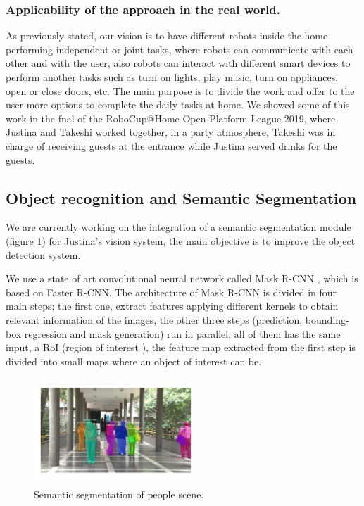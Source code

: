 \documentclass{llncs}
\begin{document}
\subsubsection{Applicability of the approach in the real world.} 

As previously stated, 
our vision is to have different robots inside the home performing independent or joint tasks, 
where robots can communicate with each other and with the user, 
 also robots can interact with different smart devices to perform another tasks such as turn on lights, play music, turn on appliances, open or close doors, etc.
The main purpose is to divide the work and offer to the user more options to complete the daily tasks at home.
We showed some of this work in the fnal of the RoboCup@Home Open Platform League 2019, where Justina and Takeshi worked together, in a party atmosphere, Takeshi was in charge of receiving guests at the entrance while Justina served drinks for the guests.


\subsection{Object recognition and Semantic Segmentation}\label{subsec:obj_recognition}

We are currently working on the integration of a semantic segmentation module (figure \ref{fig:semanticsegmetation}) for Justina's vision system, the main objective is to improve the object detection system.

We use a state of art convolutional neural network called Mask R-CNN \cite{mask-rcnn}, which is based on Faster R-CNN. The architecture of Mask R-CNN  is divided in four main steps; the first one, extract features applying different kernels to obtain relevant information of the images, the other three steps (prediction, bounding-box regression and  mask generation) run in parallel, all of them has the same input, a RoI (region of interest ), the feature map extracted from the first step is divided into small maps where an object of interest can be. 

\begin{figure}[h]
	\centering
	\includegraphics[angle=0, height=4cm, width=6cm]{Figures/instance_segmentation.png}
	\caption{Semantic segmentation of people scene.}
	\label{fig:semanticsegmetation}
\end{figure}
\end{document}

